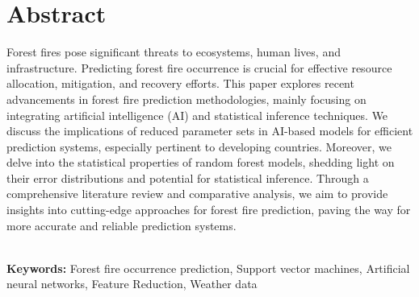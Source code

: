 \chapter*{\center \Large  Abstract}


Forest fires pose significant threats to ecosystems, human lives, and infrastructure. Predicting forest fire occurrence is crucial for effective resource allocation, mitigation, and recovery efforts. This paper explores recent advancements in forest fire prediction methodologies, mainly focusing on integrating artificial intelligence (AI) and statistical inference techniques. We discuss the implications of reduced parameter sets in AI-based models for efficient prediction systems, especially pertinent to developing countries. Moreover, we delve into the statistical properties of random forest models, shedding light on their error distributions and potential for statistical inference. Through a comprehensive literature review and comparative analysis, we aim to provide insights into cutting-edge approaches for forest fire prediction, paving the way for more accurate and reliable prediction systems.


~\\[1cm]
\noindent %
\textbf{Keywords:} Forest fire occurrence prediction, Support vector machines, Artificial neural networks, Feature Reduction, Weather data








